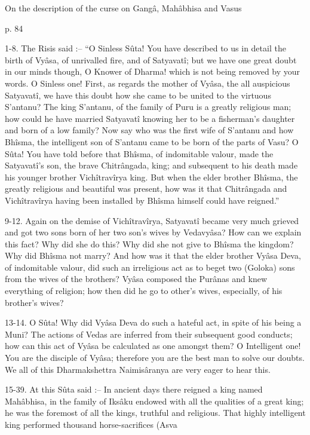 ﻿On the description of the curse on Gangâ, Mahâbhisa and Vasus

 

p. 84

 

1-8. The Risis said :-- “O Sinless Sûta! You have described to us in detail the birth of Vyâsa, of unrivalled fire, and of Satyavatî; but we have one great doubt in our minds though, O Knower of Dharma! which is not being removed by your words. O Sinless one! First, as regards the mother of Vyâsa, the all auspicious Satyavatî, we have this doubt how she came to be united to the virtuous S’antanu? The king S’antanu, of the family of Puru is a greatly religious man; how could he have married Satyavatî knowing her to be a fisherman's daughter and born of a low family? Now say who was the first wife of S’antanu and how Bhîsma, the intelligent son of S’antanu came to be born of the parts of Vasu? O Sûta! You have told before that Bhîsma, of indomitable valour, made the Satyavatî's son, the brave Chitrângada, king; and subsequent to his death made his younger brother Vichîtravîrya king. But when the elder brother Bhîsma, the greatly religious and beautiful was present, how was it that Chitrângada and Vichîtravîrya having been installed by Bhîsma himself could have reigned.”

 

9-12. Again on the demise of Vichîtravîrya, Satyavatî became very much grieved and got two sons born of her two son's wives by Vedavyâsa? How can we explain this fact? Why did she do this? Why did she not give to Bhîsma the kingdom? Why did Bhîsma not marry? And how was it that the elder brother Vyâsa Deva, of indomitable valour, did such an irreligious act as to beget two (Goloka) sons from the wives of the brothers? Vyâsa composed the Purânas and knew everything of religion; how then did he go to other's wives, especially, of his brother's wives?

 

13-14. O Sûta! Why did Vyâsa Deva do such a hateful act, in spite of his being a Muni? The actions of Vedas are inferred from their subsequent good conducts; how can this act of Vyâsa be calculated as one amongst them? O Intelligent one! You are the disciple of Vyâsa; therefore you are the best man to solve our doubts. We all of this Dharmakshettra Naimisâranya are very eager to hear this.

 

15-39. At this Sûta said :-- In ancient days there reigned a king named Mahâbhisa, in the family of Iksâku endowed with all the qualities of a great king; he was the foremost of all the kings, truthful and religious. That highly intelligent king performed thousand horse-sacrifices (Asva

